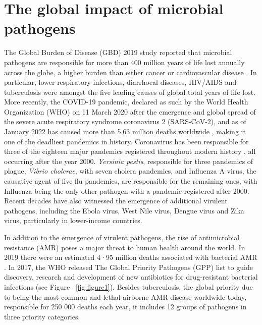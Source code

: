 \section{The global impact of microbial pathogens} \label{sec:global_impact}

The Global Burden of Disease (GBD) 2019 study reported that microbial pathogens are responsible for more than 400 million years of life lost annually across the globe, a higher burden than either cancer or cardiovascular disease \citep{vos_global_2020}. In particular, lower respiratory infections, diarrhoeal diseases, HIV/AIDS and tuberculosis were amongst the five leading causes of global total years of life lost. More recently, the COVID-19 pandemic, declared as such by the World Health Organization (WHO) on 11 March 2020 after the emergence and global spread of the severe acute respiratory syndrome coronavirus 2 (SARS-CoV-2), and as of January 2022 has caused more than 5.63 million deaths worldwide \citep{ritchie_coronavirus_2020}, making it one of the deadliest pandemics in history. Coronavirus has been responsible for three of the eighteen major pandemics registered throughout modern history \citep{piret_pandemics_2021}, all occurring after the year 2000. \textit{Yersinia pestis}, responsible for three pandemics of plague, \textit{Vibrio cholerae}, with seven cholera pandemics, and Influenza A virus, the causative agent of five flu pandemics, are responsible for the remaining ones, with Influenza being the only other pathogen with a pandemic registered after 2000. Recent decades have also witnessed the emergence of additional virulent pathogens, including the Ebola virus, West Nile virus, Dengue virus and Zika virus, particularly in lower-income countries.

In addition to the emergence of virulent pathogens, the rise of antimicrobial resistance (AMR) poses a major threat to human health around the world. In 2019 there were an estimated 4·95 million deaths associated with bacterial AMR \citep{murray_global_2022}. In 2017, the WHO released The Global Priority Pathogens (GPP) list \citep{world_health_organization_prioritization_2017} to guide discovery, research and development of new antibiotics for drug-resistant bacterial infections (see Figure ~\ref{fig:figure1}). Besides tuberculosis, the global priority due to being the most common and lethal airborne AMR disease worldwide today, responsible for 250 000 deaths each year, it includes 12 groups of pathogens in three priority categories. 

